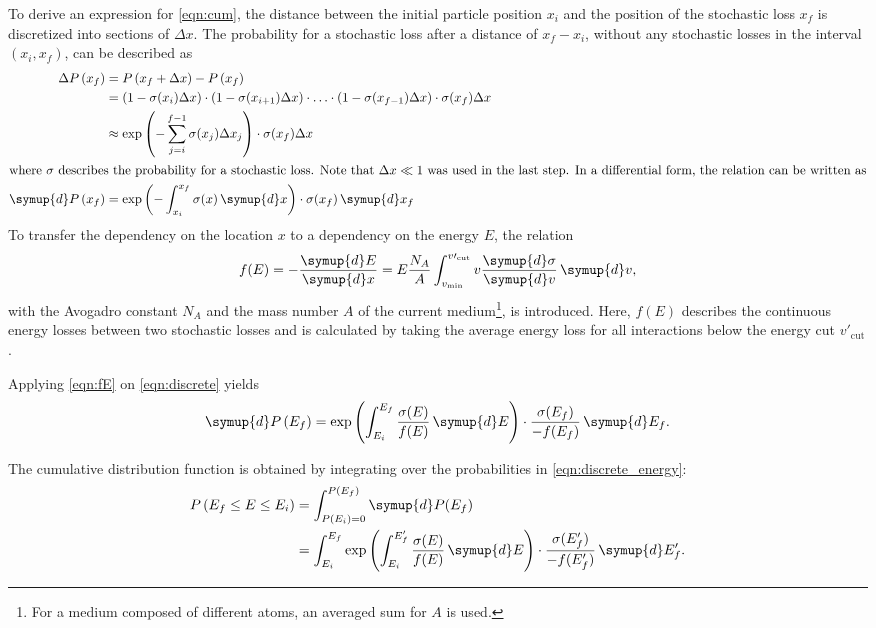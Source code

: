 To derive an expression for \eqref{eqn:cum}, the distance between the initial particle position $x_i$ and the position of the stochastic loss $x_f$ is discretized into sections of $\Delta x$.
The probability for a stochastic loss after a distance of $x_f - x_i$, without any stochastic losses in the interval $\left(x_i, x_f\right)$, can be described as
%
\begin{equation}
	\label{eqn:discrete}
	\begin{split}
	\Delta P\left(x_f\right) &= P\left( x_f + \Delta x \right) - P\left( x_f \right)\\
	&= \left( 1 - \sigma(x_i) \Delta x \right) \cdot \left( 1 - \sigma(x_{i+1}) \Delta x \right) \cdot\ldots\cdot \left( 1 - \sigma(x_{f-1}) \Delta x \right) \cdot \sigma(x_f) \Delta x \\
	&\approx \exp \left( - \sum_{j=i}^{f-1} \sigma(x_j) \Delta x_j \right) \cdot \sigma(x_f) \Delta x\\
	\intertext{where $\sigma$ describes the probability for a stochastic loss. Note that $\Delta x \ll 1$ was used in the last step. In a differential form, the relation can be written as}
	\symup{d}P\left( x_f \right) &= \exp\left(-\int_{x_i}^{x_f} \sigma(x) \, \symup{d}x \right) \cdot \sigma(x_f) \, \symup{d} x_f
	\end{split}
\end{equation}
%
To transfer the dependency on the location $x$ to a dependency on the energy $E$, the relation
%
\begin{equation}
	\label{eqn:fE}
	f(E) = -\frac{\symup{d}E}{\symup{d}x} = E \frac{N_A}{A} \int_{v_\text{min}}^{v\prime_\text{cut}} v \frac{\symup{d}\sigma}{\symup{d}v} \, \symup{d}v,
\end{equation}
%
with the Avogadro constant $N_A$ and the mass number $A$ of the current medium\footnote{For a medium composed of different atoms, an averaged sum for $A$ is used.}, is introduced.
Here, $f(E)$ describes the continuous energy losses between two stochastic losses and is calculated by taking the average energy loss for all interactions below the energy cut $v\prime_\text{cut}$.

Applying \eqref{eqn:fE} on \eqref{eqn:discrete} yields
%
\begin{equation}
	\label{eqn:discrete_energy}
	\symup{d}P\left(E_f\right) = \exp \left( \int_{E_i}^{E_f} \frac{\sigma(E)}{ f(E) } \, \symup{d}E \right) \cdot \frac{\sigma(E_f)}{-f(E_f)} \, \symup{d}E_f.
\end{equation}

The cumulative distribution function is obtained by integrating over the probabilities in \eqref{eqn:discrete_energy}:
%
\begin{equation}
	\label{eqn:cum_detail}
	\begin{split}
	P\left(E_f \leq E \leq E_i\right) &= \int_{P(E_i)=0}^{P(E_f)} \symup{d}P(E_f)\\
	&= \int_{E_i}^{E_f} \exp \left( \int_{E_i}^{E_f'} \frac{\sigma(E)}{ f(E) } \, \symup{d}E \right) \cdot \frac{\sigma(E'_f)}{-f(E'_f)} \, \symup{d}E'_f.
	\end{split}
\end{equation}

